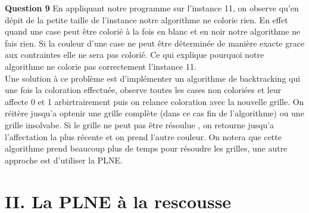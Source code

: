 \documentclass[a4paper]{memoir}
\begin{document}
\textbf{Question 9} En appliquant notre programme sur l'instance 11, on observe qu'en dépit de la petite taille de l'instance notre algorithme ne colorie rien. En effet quand une case peut être colorié à la fois en blanc et en noir notre algorithme ne fais rien. Si la couleur d'une case ne peut être déterminée de manière exacte grace aux contraintes elle ne sera pas colorié. Ce qui explique pourquoi notre algorithme ne colorie pas correctement l'instance 11.
\\
Une solution à ce problème est d'implémenter un algorithme de backtracking qui une fois la coloration effectuée, observe toutes les cases non coloriées et leur affecte 0 et 1 arbirtrairement puis on relance coloration avec la nouvelle grille. On réitère jusqu'a optenir une grille complète (dans ce cas fin de l'algorithme) ou une grille insolvabe. Si le grille ne peut pas être résoulue , on retourne jusqu'a l'affectation la plus récente et on prend l'autre couleur. On notera que cette algorithme prend beaucoup plus de temps pour résoudre les grilles, une autre approche est d'utiliser la PLNE.


 	
 	\newpage
 	\section{II. La PLNE à la rescousse}
\end{document}
